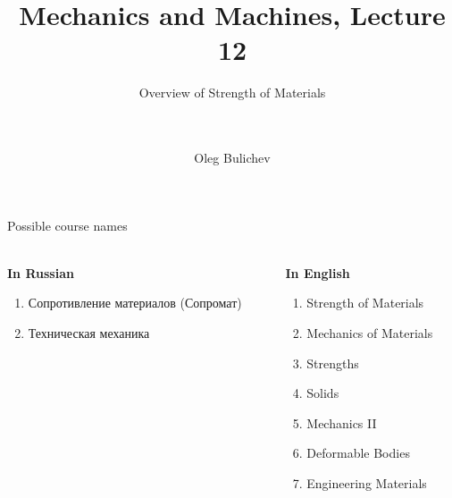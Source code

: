 \documentclass[aspectratio=169]{beamer}
\title[MaM]{Mechanics and Machines, Lecture 12} %
\subtitle{Overview of Strength of Materials  
\\ \   \\   
\ } %
\author{Oleg Bulichev}
\newcommand{\fbckg}[1]{\usebackgroundtemplate{\texttt{[image: \#1]}}}%
\begin{document}
\setlength{\abovedisplayskip}{0pt}
\setlength{\belowdisplayskip}{0pt}
\setlength{\abovedisplayshortskip}{0pt}
\setlength{\belowdisplayshortskip}{0pt}

\fbckg{fibeamer/figs/title_page.png}

\fbckg{fibeamer/figs/common.png}

\note{\scriptsize \begin{itemize}
        \item \
    \end{itemize}}

\begin{frame}[t]{Possible course names}
\framesubtitle{}
    \begin{columns}[T,onlytextwidth]
        \begin{column}{0.49\textwidth}
            \textbf{In Russian}
            \begin{enumerate}
                \item Сопротивление материалов (Сопромат)
                \item Техническая механика
            \end{enumerate}
        \end{column}
        \begin{column}{0.49\textwidth}
            \textbf{In English}
            \begin{enumerate}
                \item Strength of Materials
                \item Mechanics of Materials
                \item Strengths
                \item Solids
                \item Mechanics II
                \item Deformable Bodies
                \item Engineering Materials
            \end{enumerate}
        \end{column}
    \end{columns}
\end{frame}
\end{document}

